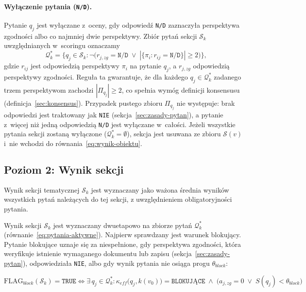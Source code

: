 \paragraph{Wyłączenie pytania (\texttt{N/D}).}
Pytanie $q_j$ jest wyłączane z~oceny, gdy odpowiedź \texttt{N/D}
zaznaczyła perspektywa zgodności albo co najmniej dwie perspektywy.
Zbiór pytań sekcji $\mathcal{S}_k$ uwzględnianych w~scoringu oznaczamy
\begin{equation}
\mathcal{Q}^{*}_k =
\bigl\{ q_j \in \mathcal{S}_k :
  \neg\bigl(r_{j,zg} = \texttt{N/D}
  \;\vee\;
  |\{\pi_i : r_{ij} = \texttt{N/D}\}| \geq 2\bigr)
\bigr\},
\label{eq:pytania-aktywne}
\end{equation}
gdzie $r_{ij}$ jest odpowiedzią perspektywy $\pi_i$ na pytanie $q_j$,
a $r_{j,zg}$ odpowiedzią perspektywy zgodności.
Reguła ta gwarantuje, że dla każdego $q_j \in \mathcal{Q}^{*}_k$
zadanego trzem perspektywom zachodzi $|\Pi_{q_j}| \geq 2$, co spełnia
wymóg definicji konsensusu (definicja~\ref{sec:konsensus}).
Przypadek pustego zbioru $\Pi_{q_j}$ nie występuje: brak odpowiedzi
jest traktowany jak \texttt{NIE} (sekcja~\ref{sec:zasady-pytan}),
a pytanie z~więcej niż jedną odpowiedzią \texttt{N/D} jest wyłączane
w~całości. Jeżeli wszystkie pytania sekcji zostaną wyłączone
($\mathcal{Q}^{*}_k = \emptyset$), sekcja jest usuwana ze zbioru
$\mathcal{S}(v)$ i~nie wchodzi do równania~\eqref{eq:wynik-obiektu}.

\subsection{Poziom 2: Wynik sekcji}
\label{sec:wynik-sekcji}

Wynik sekcji tematycznej $\mathcal{S}_k$ jest
wyznaczany jako ważona średnia wyników wszystkich
pytań należących do tej sekcji, z uwzględnieniem
obligatoryjności pytania.

Wynik sekcji $\mathcal{S}_k$ jest wyznaczany dwuetapowo
na zbiorze pytań $\mathcal{Q}^{*}_k$ (równanie~\eqref{eq:pytania-aktywne}).
Najpierw sprawdzany jest warunek blokujący.
Pytanie blokujące uznaje się za niespełnione, gdy perspektywa
zgodności, która weryfikuje istnienie wymaganego dokumentu lub zapisu
(sekcja~\ref{sec:zasady-pytan}), odpowiedziała \texttt{NIE},
albo gdy wynik pytania nie osiąga progu $\theta_{block}$:

\begin{equation}
\text{FLAG}_{block}(\mathcal{S}_k) = \texttt{TRUE}
\iff
\exists\, q_j \in \mathcal{Q}^{*}_k :
\kappa_{eff}\bigl(q_j, k(v_0)\bigr) = \texttt{BLOKUJĄCE}
\;\wedge\;
\bigl(a_{j,zg} = 0 \;\vee\; S(q_j) < \theta_{block}\bigr)
\label{eq:flag-block-sekcja}
\end{equation}

